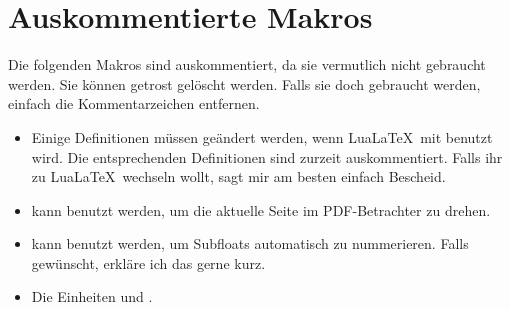 \section{Auskommentierte Makros}
Die folgenden Makros sind auskommentiert, da sie vermutlich nicht gebraucht werden.
Sie können getrost gelöscht werden.
Falls sie doch gebraucht werden, einfach die Kommentarzeichen entfernen.
\begin{itemize}
  \item Einige Definitionen müssen geändert werden, wenn Lua\LaTeX\ mit  benutzt wird.
    Die entsprechenden Definitionen sind zurzeit auskommentiert.
    Falls ihr zu Lua\LaTeX\ wechseln wollt, sagt mir am besten einfach Bescheid.
  
  \item \texttt{\string\thispagepdflscape} kann benutzt werden, um die aktuelle Seite im PDF-Betrachter zu drehen.
  
  \item \texttt{\string\tagsubfloats} kann benutzt werden, um Subfloats automatisch zu nummerieren.
    Falls gewünscht, erkläre ich das gerne kurz.
    
  \item Die Einheiten \texttt{\string\dBm} und \texttt{\string\Phizero}.
\end{itemize}

\makedocumentend

